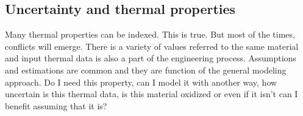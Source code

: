 \documentclass[final]{cubedoc}
\begin{document}
	
	\subsection{Uncertainty and thermal properties}
	
	
	
	Many thermal properties can be indexed. This is true. But most of the times, conflicts will emerge. There is a variety of values referred to the same material and input thermal data is also a part of the engineering process. Assumptions and estimations are  common and they are function of the general modeling approach. Do I need this property, can I model it with another way, how uncertain is this thermal data, is this material oxidized or even if it isn't can I benefit assuming that it is? 
	
\end{document}
